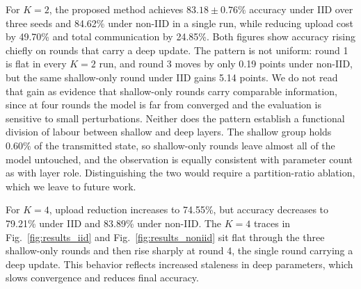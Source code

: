 \documentclass[10pt,conference]{IEEEtran}
\begin{document}
For $K=2$, the proposed method achieves $83.18 \pm 0.76\%$ accuracy under IID over three seeds and 84.62\% under non-IID in a single run, while reducing upload cost by 49.70\% and total communication by 24.85\%. Both figures show accuracy rising chiefly on rounds that carry a deep update. The pattern is not uniform: round 1 is flat in every $K=2$ run, and round 3 moves by only 0.19 points under non-IID, but the same shallow-only round under IID gains 5.14 points. We do not read that gain as evidence that shallow-only rounds carry comparable information, since at four rounds the model is far from converged and the evaluation is sensitive to small perturbations. Neither does the pattern establish a functional division of labour between shallow and deep layers. The shallow group holds $0.60\%$ of the transmitted state, so shallow-only rounds leave almost all of the model untouched, and the observation is equally consistent with parameter count as with layer role. Distinguishing the two would require a partition-ratio ablation, which we leave to future work.

For $K=4$, upload reduction increases to 74.55\%, but accuracy decreases to 79.21\% under IID and 83.89\% under non-IID. The $K=4$ traces in Fig.~\ref{fig:results_iid} and Fig.~\ref{fig:results_noniid} sit flat through the three shallow-only rounds and then rise sharply at round 4, the single round carrying a deep update. This behavior reflects increased staleness in deep parameters, which slows convergence and reduces final accuracy.
\end{document}
